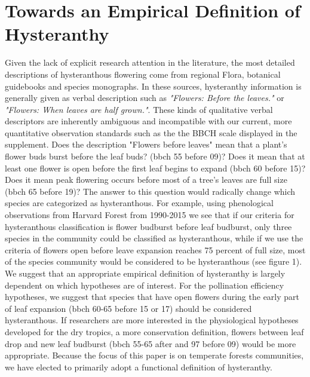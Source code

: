 \documentclass{article}
\begin{document}
\section*{Towards an Empirical Definition of Hysteranthy}
\indent Given the lack of explicit research attention in the literature, the most detailed descriptions of hysteranthous flowering come from regional Flora, botanical guidebooks and species monographs. In these sources, hysteranthy information is generally given as verbal description such as \textit{"Flowers: Before the leaves."} or \textit{"Flowers: When leaves are half grown."}\citep{Barnes2014}. %
 These kinds of qualitative verbal descriptors are inherently ambiguous and incompatible with our current, more quantitative observation standards such as the the BBCH scale \citep{Finn2007} displayed in the supplement. Does the description "Flowers before leaves"  mean that a plant's flower buds burst before the leaf buds? (bbch 55 before 09)? Does it mean that at least one flower is open before the first leaf begins to expand (bbch 60 before 15)? Does it mean peak flowering occurs before most of a tree's leaves are full size (bbch 65 before 19)? The answer to this question would radically change which species are categorized as hysteranthous. For example, using phenological observations from Harvard Forest from 1990-2015 \citep{OKeefe2015} we see that if our criteria for hysteranthous classification is flower budburst before leaf budburst, only three species in the community could be classified as hysteranthous, while if we use the criteria of flowers open before leave expansion reaches 75 percent of full size, most of the species community would be considered to be hysteranthous (see figure 1).  We suggest that an appropriate empirical definition of hysteranthy is largely dependent on which hypotheses are of interest. For the pollination efficiency hypotheses, we suggest that species that have open flowers during the early part of leaf expansion (bbch 60-65 before 15 or 17) should be considered hysteranthous. If researchers are more interested in the physiological hypotheses developed for the dry tropics, a more conservation definition, flowers between leaf drop and new leaf budburst (bbch 55-65 after and 97 before 09) would be more appropriate.%
 Because the focus of this paper is on temperate forests communities, we have elected to primarily adopt a functional definition of hysteranthy.\\
\end{document}
